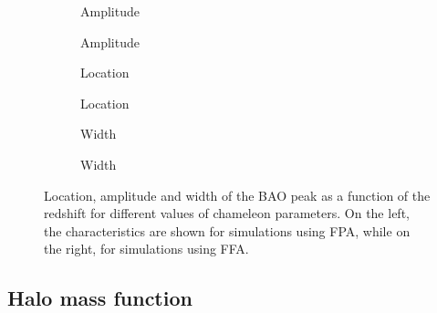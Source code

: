 \begin{figure*}
\centering
	\begin{subfigure}{0.5\textwidth}
	\end{subfigure}
	\begin{subfigure}{0.5\textwidth}
		\caption{Amplitude}
	\end{subfigure}%
	\begin{subfigure}{0.5\textwidth}
		\caption{Amplitude}
	\end{subfigure}
	\begin{subfigure}{0.5\textwidth}
		\caption{Location}
	\end{subfigure}%
	\begin{subfigure}{0.5\textwidth}
		\caption{Location}
	\end{subfigure}
	\begin{subfigure}{0.5\textwidth}
		\caption{Width}
	\end{subfigure}%
	\begin{subfigure}{0.5\textwidth}
		\caption{Width}
	\end{subfigure}
	\caption{Location, amplitude and width of the BAO peak as a function of the redshift for different values of chameleon parameters. On the left, the characteristics are shown for simulations using FPA, while on the right, for simulations using FFA.}
	\label{fig:chi_corr_peak}
\end{figure*}

\subsection{Halo mass function}